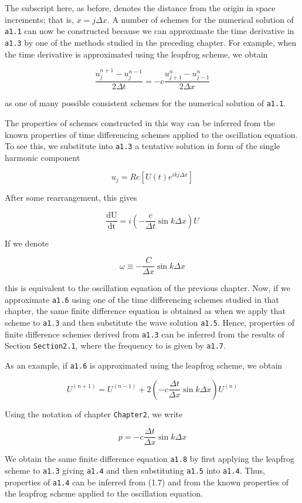 The subscript here, as before, denotes the distance from the origin in
space increments; that is, \(x = j\Delta x\). A number of schemes for
the numerical solution of \texttt{a1.1} can now be constructed because
we can approximate the time derivative in \texttt{a1.3} by one of the
methods studied in the preceding chapter. For example, when the time
derivative is approximated using the leapfrog scheme, we obtain

 \[\frac{u_{j}^{n + 1} - u_{j}^{n - 1}}{2\Delta t} = - c\frac{u_{j + 1}^n - u_{j - 1}^n}{2\Delta x}\]

as one of many possible consistent schemes for the numerical solution of
\texttt{a1.1}.

The properties of schemes constructed in this way can be inferred from
the known properties of time differencing schemes applied to the
oscillation equation. To see this, we substitute into \texttt{a1.3} a
tentative solution in form of the single harmonic component

 \[u_{j} = Re\left\lbrack U\left( t \right)e^{ikj\Delta x} \right\rbrack\]

After some rearrangement, this gives

 \[\frac{\text{dU}}{\text{dt}} = i\left( - \frac{c}{\Delta t}\sin{k\Delta x} \right)U\]

If we denote

 \[\omega \equiv - \frac{C}{\Delta x}\sin{k\Delta x}\]

this is equivalent to the oscillation equation of the previous chapter.
Now, if we approximate \texttt{a1.6} using one of the time differencing
schemes studied in that chapter, the same finite difference equation is
obtained as when we apply that scheme to \texttt{a1.3} and then
substitute the wave solution \texttt{a1.5}. Hence, properties of finite
difference schemes derived from \texttt{a1.3} can be inferred from the
results of Section \texttt{Section2.1}, where the frequency to is given
by \texttt{a1.7}.

As an example, if \texttt{a1.6} is approximated using the leapfrog
scheme, we obtain

 \[U^{\left( n + 1 \right)} = U^{\left( n - 1 \right)} + 2\left( - c\frac{\Delta t}{\Delta x}\sin{k\Delta x} \right)U^{\left( n \right)}\]

Using the notation of chapter \texttt{Chapter2}, we write

 \[p = - c\frac{\Delta t}{\Delta x}\sin{k\Delta x}\]

We obtain the same finite difference equation \texttt{a1.8} by first
applying the leapfrog scheme to \texttt{a1.3} giving \texttt{a1.4} and
then substituting \texttt{a1.5} into \texttt{a1.4}. Thus, properties of
\texttt{a1.4} can be inferred from (1.7) and from the known properties
of the leapfrog scheme applied to the oscillation equation.

